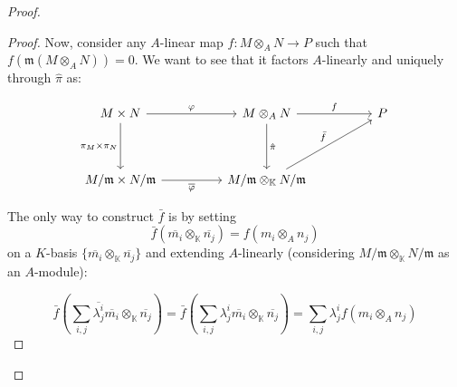 \begin{problem}
\begin{enumerate}[label=(\theproblem.\arabic*),ref=\theproblem.\arabic*]
\begin{sol}
\begin{proof}
\begin{claim}
\begin{proof}
                                Now, consider any $A$-linear map $f: M \otimes_A N \rightarrow P$ such that $f(\mathfrak{m}(M \otimes_A N)) = 0$.
                                We want to see that it factors $A$-linearly and uniquely through $\hat{\pi}$ as:

                                \begin{center}
                                    \[\begin{tikzcd}
                                    {M \times N} && {M \otimes_A N} && P \\
                                    \\
                                    {M / \mathfrak{m} \times N / \mathfrak{m}} && {M / \mathfrak{m} \otimes_{\mathbb{K}} N / \mathfrak{m}}
                                    \arrow["\varphi", from=1-1, to=1-3]
                                    \arrow["{\hat{\pi}}", from=1-3, to=3-3]
                                    \arrow["{\pi_M\times\pi_N}"', from=1-1, to=3-1]
                                    \arrow["{\overline{\varphi}}"', from=3-1, to=3-3]
                                    \arrow["f", from=1-3, to=1-5]
                                    \arrow["{\bar{f}}", from=3-3, to=1-5]
                                \end{tikzcd}\]

                                \end{center}

                                The only way to construct
                                $\bar{f}$ is by setting \[{\bar{f}(\overline{m_i} \otimes_{\mathbb{K}} \overline{n_j}) = f(m_i \otimes_A n_j)}\]
                                on a $K$-basis $\{\overline{m_i} \otimes_{\mathbb{K}} \overline{n_j}\}$ and extending $A$-linearly (considering $M/\mathfrak{m} \otimes_{\mathbb{K}} N / \mathfrak{m}$ as an $A$-module):

                                \[
                                    \bar{f} \left( \sum_{i,j} \overline{\lambda^i_j} \overline{m_i} \otimes_\mathbb{K} \overline{n_j} \right) =
                                    \bar{f} \left( \sum_{i,j} \lambda^i_j \overline{m_i} \otimes_\mathbb{K} \overline{n_j} \right) =
                                    \sum_{i,j} \lambda^i_j f(m_i \otimes_A n_j)
                                \]


\end{proof}
\end{claim}
\end{proof}
\end{sol}
\end{enumerate}
\end{problem}

